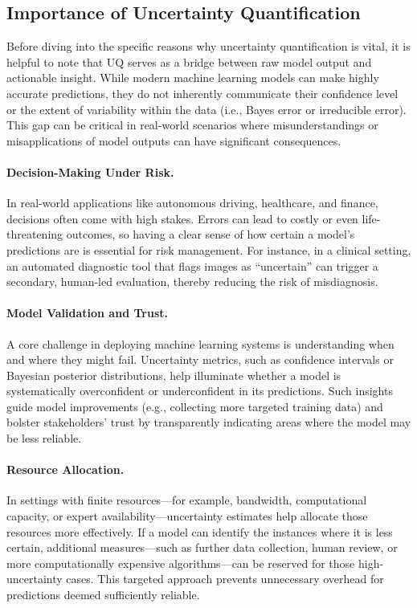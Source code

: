 \subsection{Importance of Uncertainty Quantification}
Before diving into the specific reasons why uncertainty quantification is vital, it is helpful to note that UQ serves as a bridge between raw model output and actionable insight. While modern machine learning models can make highly accurate predictions, they do not inherently communicate their confidence level or the extent of variability within the data (i.e., Bayes error or irreducible error). This gap can be critical in real-world scenarios where misunderstandings or misapplications of model outputs can have significant consequences.

\paragraph{Decision-Making Under Risk.} In real-world applications like autonomous driving, healthcare, and finance, decisions often come with high stakes. Errors can lead to costly or even life-threatening outcomes, so having a clear sense of how certain a model’s predictions are is essential for risk management. For instance, in a clinical setting, an automated diagnostic tool that flags images as “uncertain” can trigger a secondary, human-led evaluation, thereby reducing the risk of misdiagnosis.
\paragraph{Model Validation and Trust.} A core challenge in deploying machine learning systems is understanding when and where they might fail. Uncertainty metrics, such as confidence intervals or Bayesian posterior distributions, help illuminate whether a model is systematically overconfident or underconfident in its predictions. Such insights guide model improvements (e.g., collecting more targeted training data) and bolster stakeholders’ trust by transparently indicating areas where the model may be less reliable.
\paragraph{Resource Allocation.} In settings with finite resources---for example, bandwidth, computational capacity, or expert availability---uncertainty estimates help allocate those resources more effectively. If a model can identify the instances where it is less certain, additional measures---such as further data collection, human review, or more computationally expensive algorithms---can be reserved for those high-uncertainty cases. This targeted approach prevents unnecessary overhead for predictions deemed sufficiently reliable.
